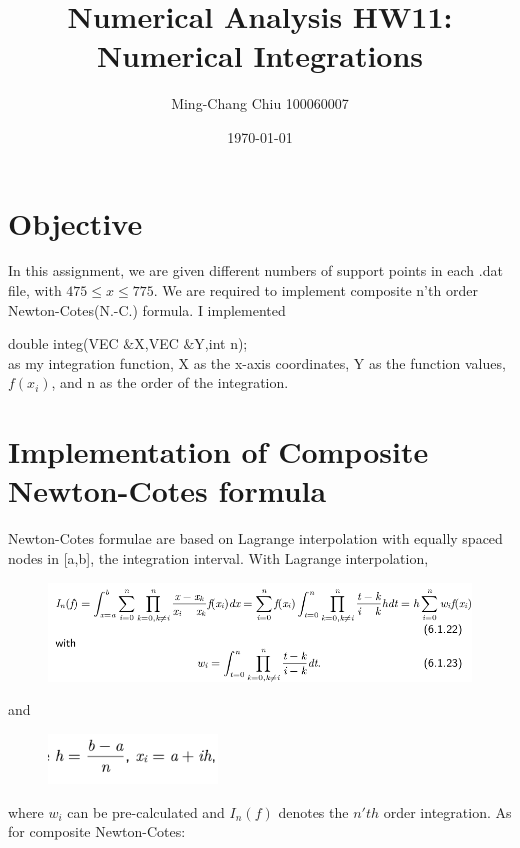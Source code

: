 \documentclass[12pt,a4paper]{article}
\title{Numerical Analysis HW11: Numerical Integrations}
\author{Ming-Chang Chiu 100060007}
\date{\today}
\begin{document}
\maketitle
\fontsize{12}{20pt}\selectfont %

\section{Objective}
In this assignment, we are given different numbers of support points in each .dat file, with $475 \le x \le 775$. We are required to implement composite n'th order Newton-Cotes(N.-C.) formula. I implemented 

double integ(VEC $\&$X,VEC $\&$Y,int n); \\
as my integration function, X as the x-axis coordinates, Y as the function values, $f(x_i)$, and n as the order of the integration.

\section{Implementation of Composite Newton-Cotes formula}
Newton-Cotes formulae are based on Lagrange interpolation with equally spaced nodes in [a,b], the integration interval. With Lagrange interpolation, 
\begin{figure}[h!]
  \centering
     \includegraphics[width=1\textwidth]{./lagrange.png}
  
\end{figure}

and 
\begin{figure}[h!]
  \centering
     \includegraphics[width=0.4\textwidth]{./h.png}
\end{figure}

where $w_i$ can be pre-calculated and $I_n(f)$ denotes the $n'th$ order integration.
\newpage
As for composite Newton-Cotes:
\end{document}
